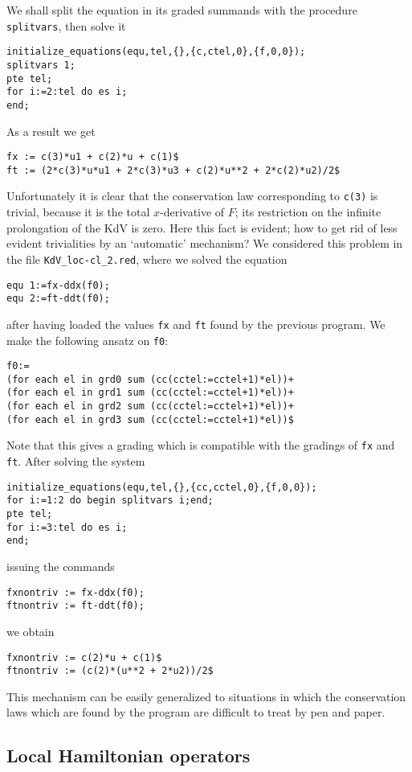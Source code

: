 \documentclass[12pt]{amsart}
\theoremstyle{definition}
\begin{document}
We shall split the equation in its graded summands with the procedure
\texttt{splitvars}, then solve it
\begin{verbatim}
initialize_equations(equ,tel,{},{c,ctel,0},{f,0,0});
splitvars 1;
pte tel;
for i:=2:tel do es i;
end;
\end{verbatim}
As a result we get
\begin{verbatim}
fx := c(3)*u1 + c(2)*u + c(1)$
ft := (2*c(3)*u*u1 + 2*c(3)*u3 + c(2)*u**2 + 2*c(2)*u2)/2$
\end{verbatim}
Unfortunately it is clear that the conservation law corresponding to
\texttt{c(3)} is trivial, because it is the total $x$-derivative of $F$; its
restriction on the infinite prolongation of the KdV is zero. Here this fact is
evident; how to get rid of less evident trivialities by an `automatic'
mechanism? We considered this problem in the file \texttt{KdV\_loc-cl\_2.red},
where we solved the equation
\begin{verbatim}
equ 1:=fx-ddx(f0);
equ 2:=ft-ddt(f0);
\end{verbatim}
after having loaded the values \texttt{fx} and \texttt{ft} found by the
previous program. We make the following ansatz on \texttt{f0}:
\begin{verbatim}
f0:=
(for each el in grd0 sum (cc(cctel:=cctel+1)*el))+
(for each el in grd1 sum (cc(cctel:=cctel+1)*el))+
(for each el in grd2 sum (cc(cctel:=cctel+1)*el))+
(for each el in grd3 sum (cc(cctel:=cctel+1)*el))$
\end{verbatim}
Note that this gives a grading which is compatible with the gradings of
\texttt{fx} and \texttt{ft}. After solving the system
\begin{verbatim}
initialize_equations(equ,tel,{},{cc,cctel,0},{f,0,0});
for i:=1:2 do begin splitvars i;end;
pte tel;
for i:=3:tel do es i;
end;
\end{verbatim}
issuing the commands
\begin{verbatim}
fxnontriv := fx-ddx(f0);
ftnontriv := ft-ddt(f0);
\end{verbatim}
we obtain
\begin{verbatim}
fxnontriv := c(2)*u + c(1)$
ftnontriv := (c(2)*(u**2 + 2*u2))/2$
\end{verbatim}
This mechanism can be easily generalized to situations in which the
conservation laws which are found by the program are difficult to treat by pen
and paper.


\subsection{Local Hamiltonian operators}
\label{sec:local-hamilt-oper}
\end{document}
